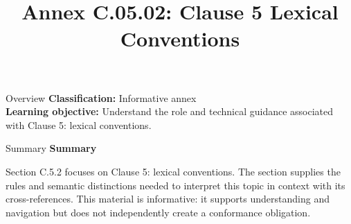 \documentclass[10pt,letterpaper]{article}
\title{Annex C.05.02: Clause 5 Lexical Conventions}
\author{}
\date{}
\begin{document}
\maketitle
\begin{CornellOverviewBox}{Overview}
\textbf{Classification:} Informative annex\\[2pt]
\textbf{Learning objective:} Understand the role and technical guidance associated with Clause 5: lexical conventions.
\end{CornellOverviewBox}\begin{CornellSummaryBox}{Summary}
{\sffamily\bfseries\color{Accent} Summary}\par\vspace{3pt}Section C.5.2 focuses on Clause 5: lexical conventions. The section supplies the rules and semantic distinctions needed to interpret this topic in context with its cross-references. This material is informative: it supports understanding and navigation but does not independently create a conformance obligation.
\end{CornellSummaryBox}
\end{document}
